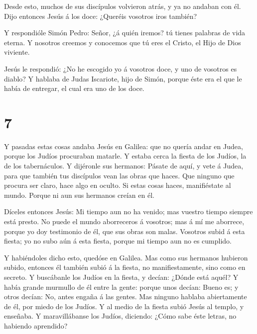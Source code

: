  Desde esto, muchos de sus discípulos volvieron atrás, y ya
no andaban con él.  Dijo entonces Jesús á los doce:
¿Queréis vosotros iros también?

 Y respondióle Simón Pedro: Señor, ¿á quién iremos? tú
tienes palabras de vida eterna.  Y nosotros creemos y
conocemos que tú eres el Cristo, el Hijo de Dios viviente.

 Jesús le respondió: ¿No he escogido yo á vosotros doce, y
uno de vosotros es diablo?  Y hablaba de Judas Iscariote,
hijo de Simón, porque éste era el que le había de entregar, el cual era
uno de los doce.

\hypertarget{section-6}{%
\section{7}\label{section-6}}

 Y pasadas estas cosas andaba Jesús en Galilea: que no
quería andar en Judea, porque los Judíos procuraban matarle.
 Y estaba cerca la fiesta de los Judíos, la de los
tabernáculos.  Y dijéronle sus hermanos: Pásate de aquí, y
vete á Judea, para que también tus discípulos vean las obras que haces.
 Que ninguno que procura ser claro, hace algo en oculto. Si
estas cosas haces, manifiéstate al mundo.  Porque ni aun sus
hermanos creían en él.

 Díceles entonces Jesús: Mi tiempo aun no ha venido; mas
vuestro tiempo siempre está presto.  No puede el mundo
aborreceros á vosotros; mas á mí me aborrece, porque yo doy testimonio
de él, que sus obras son malas.  Vosotros subid á esta
fiesta; yo no subo aún á esta fiesta, porque mi tiempo aun no es
cumplido.

 Y habiéndoles dicho esto, quedóse en Galilea. 
Mas como sus hermanos hubieron subido, entonces él también subió á la
fiesta, no manifiestamente, sino como en secreto.  Y
buscábanle los Judíos en la fiesta, y decían: ¿Dónde está aquél?
 Y había grande murmullo de él entre la gente: porque unos
decían: Bueno es; y otros decían: No, antes engaña á las gentes.
 Mas ninguno hablaba abiertamente de él, por miedo de los
Judíos.  Y al medio de la fiesta subió Jesús al templo, y
enseñaba.  Y maravillábanse los Judíos, diciendo: ¿Cómo
sabe éste letras, no habiendo aprendido?

